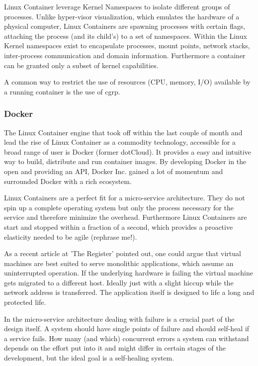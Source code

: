 Linux Container leverage Kernel Namespaces to isolate different groups of processes. Unlike hyper-visor visualization, which emulates
the hardware of a physical computer, Linux Containers are spawning processes with certain flags, attaching the process (and its child's)
to a set of namespaces. Within the Linux Kernel namespaces exist to encapsulate processes, mount points, network stacks,
inter-process communication and domain information. Furthermore a container can be granted only a subset of kernel capabilities.

A common way to restrict the use of resources (CPU, memory, I/O) available by a running container is the use of \gls{cgrp}.

\subsubsection{Docker}
The Linux Container engine that took off within the last couple of month and lead the rise of Linux Container as a commodity technology, accessible
for a broad range of user is Docker (former dotCloud). It provides a easy and intuitive way to build, distribute and run container images.
By developing Docker in the open and providing an API, Docker Inc. gained a lot of momentum and surrounded Docker with a rich ecosystem.

Linux Containers are a perfect fit for a micro-service architecture. They do not spin up a complete operating system but only the process
necessary for the service and therefore minimize the overhead. Furthermore Linux Containers are start and stopped within a
fraction of a second, which provides a proactive elasticity needed to be agile (rephrase me!).

As a recent article at 'The Register' pointed out, one could argue that virtual machines are best suited to serve monolithic applications,
which assume an uninterrupted operation. If the underlying hardware is failing the virtual machine gets migrated to a different host. Ideally just
with a slight hiccup while the network address is transferred. The application itself is designed to life a long and protected life.

In the micro-service architecture dealing with failure is a crucial part of the design itself. A system should have single points of failure and
should self-heal if a service fails. How many (and which) concurrent errors a system can withstand depends on the effort put into it and might differ
in certain stages of the development, but the ideal goal is a self-healing system.


